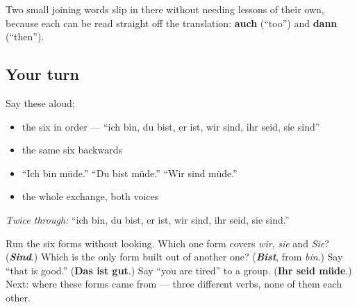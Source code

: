 Two small joining words slip in there without needing lessons of their own, because each can be read straight off the translation: \textbf{auch} (\textquotedblleft{}too\textquotedblright{}) and \textbf{dann} (\textquotedblleft{}then\textquotedblright{}).

\subsection*{Your turn}
Say these aloud:

\begin{itemize}
\raggedright
  \item the six in order — \textquotedblleft{}ich bin, du bist, er ist, wir sind, ihr seid, sie sind\textquotedblright{}
  \item the same six backwards
  \item \textquotedblleft{}Ich bin müde.\textquotedblright{} \textquotedblleft{}Du bist müde.\textquotedblright{} \textquotedblleft{}Wir sind müde.\textquotedblright{}
  \item the whole exchange, both voices
\end{itemize}

\emph{Twice through:} \textquotedblleft{}ich bin, du bist, er ist, wir sind, ihr seid, sie sind.\textquotedblright{}

\begin{tcolorbox}[breakable,colback=teal!4,colframe=teal!35!black,title={Before you move on}]
Run the six forms without looking. Which one form covers \emph{wir}, \emph{sie} and \emph{Sie}? (\emph{\textbf{Sind}}.) Which is the only form built out of another one? (\emph{\textbf{Bist}}, from \emph{bin}.) Say \textquotedblleft{}that is good.\textquotedblright{} (\textbf{Das ist gut}.) Say \textquotedblleft{}you are tired\textquotedblright{} to a group. (\textbf{Ihr seid müde}.) Next: where these forms came from — three different verbs, none of them each other.
\end{tcolorbox}
